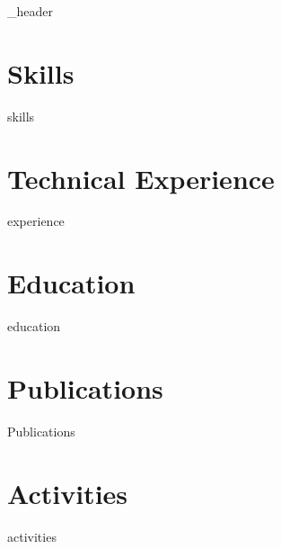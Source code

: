 \documentclass[letter,10pt]{article}
\author{Noah S. Miller} %
\begin{document}
{_header}
\section{Skills}
{skills}

\section{Technical Experience}
{experience}

\section{Education}
{education}

\section{Publications}
{Publications}

\section{Activities}
{activities}
\end{document}
